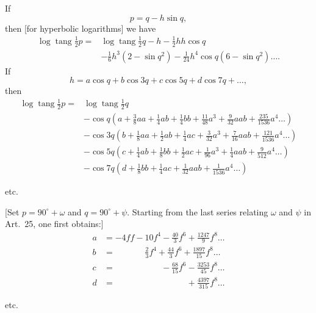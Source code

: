 \bigskip
{\centering [31.]\par{}\par}
If
\[p=q-h\sin q,\]
\noindent then [for hyperbolic logarithms] we have
\[
\begin{aligned}
\log\operatorname{tang}\tfrac12p={}&\log\operatorname{tang}\tfrac12q-h-\tfrac12hh\cos q\\
&-\tfrac16h^3(2-\sin q^2)-\tfrac1{24}h^4\cos q(6-\sin q^2)\ldots.
\end{aligned}
\]
If
\[h=a\cos q+b\cos3q+c\cos5q+d\cos7q+\ldots,\]
\noindent then
\[
\begin{aligned}
\log\operatorname{tang}\tfrac12p={}&\log\operatorname{tang}\tfrac12q\\
&-\cos q\left(a+\tfrac38aa+\tfrac14ab+\tfrac14bb+\tfrac{11}{48}a^3+\tfrac9{32}aab+\tfrac{235}{1536}a^4\ldots\right)\\
&-\cos3q\left(b+\tfrac18aa+\tfrac12ab+\tfrac14ac+\tfrac3{32}a^3+\tfrac7{16}aab+\tfrac{121}{1536}a^4\ldots\right)\\
&-\cos5q\left(c+\tfrac14ab+\tfrac18bb+\tfrac12ac+\tfrac1{96}a^3+\tfrac14aab+\tfrac9{512}a^4\ldots\right)\\
&-\cos7q\left(d+\tfrac18bb+\tfrac14ac+\tfrac1{32}aab+\tfrac1{1536}a^4\ldots\right)
\end{aligned}
\]
{\centering etc.\par}
[Set \(p=90^\circ+\omega\) and \(q=90^\circ+\psi\). Starting from the last series relating \(\omega\) and \(\psi\) in Art.~25, one first obtains:]
\[
\begin{aligned}
a&=-4ff-10f^4-\frac{40}{3}f^6+\frac{1247}{9}f^8\ldots\\
b&=\phantom{-4ff-}\frac23f^4+\frac{44}{3}f^6+\frac{1897}{15}f^8\ldots\\
c&=\phantom{-4ff-10f^4}-\frac{68}{15}f^6-\frac{3253}{45}f^8\ldots\\
d&=\phantom{-4ff-10f^4-\frac{40}{3}f^6}+\frac{4397}{315}f^8\ldots
\end{aligned}
\]
{\centering etc.\par}
